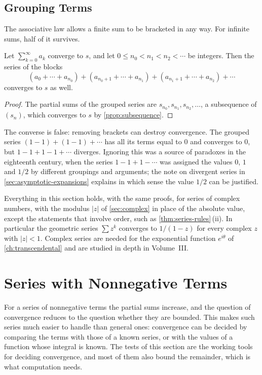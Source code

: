 \subsection{Grouping Terms}

The associative law allows a finite sum to be bracketed in any way. For infinite sums, half of it survives.

\begin{proposition}
\label{prop:grouping}
Let $\sum_{k=0}^\infty a_k$ converge to $s$, and let $0\le n_0<n_1<n_2<\cdots$ be integers. Then the series of the blocks
\[
(a_0+\cdots+a_{n_0})+(a_{n_0+1}+\cdots+a_{n_1})+(a_{n_1+1}+\cdots+a_{n_2})+\cdots
\]
converges to $s$ as well.
\end{proposition}

\begin{proof}
The partial sums of the grouped series are $s_{n_0},s_{n_1},s_{n_2},\ldots$, a subsequence of $(s_n)$, which converges to $s$ by \cref{prop:subsequence}.
\end{proof}

The converse is false: removing brackets can destroy convergence. The grouped series $(1-1)+(1-1)+\cdots$ has all its terms equal to $0$ and converges to $0$, but $1-1+1-1+\cdots$ diverges. Ignoring this was a source of paradoxes in the eighteenth century, when the series $1-1+1-\cdots$ was assigned the values $0$, $1$ and $1/2$ by different groupings and arguments; the note on divergent series in \cref{sec:asymptotic-expansions} explains in which sense the value $1/2$ can be justified.

Everything in this section holds, with the same proofs, for series of complex numbers, with the modulus $|z|$ of \cref{sec:complex} in place of the absolute value, except the statements that involve order, such as \cref{thm:series-rules}\,(ii). In particular the geometric series $\sum z^k$ converges to $1/(1-z)$ for every complex $z$ with $|z|<1$. Complex series are needed for the exponential function $e^{i\theta}$ of \cref{ch:transcendental} and are studied in depth in Volume~III.

\section{Series with Nonnegative Terms}
\label{sec:nonnegative-series}

For a series of nonnegative terms the partial sums increase, and the question of convergence reduces to the question whether they are bounded. This makes such series much easier to handle than general ones: convergence can be decided by comparing the terms with those of a known series, or with the values of a function whose integral is known. The tests of this section are the working tools for deciding convergence, and most of them also bound the remainder, which is what computation needs.

